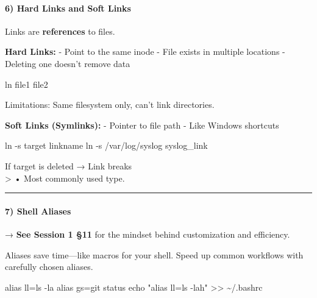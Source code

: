 \documentclass[
  english,
  paper=a4,
  oneside  ,captions=tableheading
]{scrartcl}
\newenvironment{Shaded}{}{}
\newcommand{\AttributeTok}[1]{\textcolor[rgb]{0.49,0.56,0.16}{#1}}
\newcommand{\BuiltInTok}[1]{\textcolor[rgb]{0.00,0.50,0.00}{#1}}
\newcommand{\FunctionTok}[1]{\textcolor[rgb]{0.02,0.16,0.49}{#1}}
\newcommand{\NormalTok}[1]{#1}
\newcommand{\OperatorTok}[1]{\textcolor[rgb]{0.40,0.40,0.40}{#1}}
\newcommand{\StringTok}[1]{\textcolor[rgb]{0.25,0.44,0.63}{#1}}
\renewenvironment{quote}{\begin{customblockquote}\list{}{\rightmargin=0em\leftmargin=0em}%
\item\relax\color{blockquote-text}\ignorespaces}{\unskip\unskip\endlist\end{customblockquote}}
\begin{document}
\paragraph{6) Hard Links and Soft
Links}\label{hard-links-and-soft-links}

Links are \textbf{references} to files.

\textbf{Hard Links:} - Point to the same inode - File exists in multiple
locations - Deleting one doesn't remove data

\begin{Shaded}
\begin{Highlighting}[]
\FunctionTok{ln}\NormalTok{ file1 file2}
\end{Highlighting}
\end{Shaded}

Limitations: Same filesystem only, can't link directories.

\textbf{Soft Links (Symlinks):} - Pointer to file path - Like Windows
shortcuts

\begin{Shaded}
\begin{Highlighting}[]
\FunctionTok{ln} \AttributeTok{{-}s}\NormalTok{ target linkname}
\FunctionTok{ln} \AttributeTok{{-}s}\NormalTok{ /var/log/syslog syslog\_link}
\end{Highlighting}
\end{Shaded}

If target is deleted → \faTimesCircle Link breaks\\
\textgreater{} • Most commonly used type.

\begin{center}\rule{0.5\linewidth}{0.5pt}\end{center}

\paragraph{7) Shell Aliases}\label{shell-aliases}

\begin{quote}
→ \textbf{See Session 1 §11} for the mindset behind customization and
efficiency.
\end{quote}

Aliases save time---like macros for your shell. Speed up common
workflows with carefully chosen aliases.

\begin{Shaded}
\begin{Highlighting}[]
\BuiltInTok{alias}\NormalTok{ ll=}\StringTok{\textquotesingle{}ls {-}la\textquotesingle{}}
\BuiltInTok{alias}\NormalTok{ gs=}\StringTok{\textquotesingle{}git status\textquotesingle{}}
\BuiltInTok{echo} \StringTok{"alias ll=\textquotesingle{}ls {-}lah\textquotesingle{}"} \OperatorTok{\textgreater{}\textgreater{}}\NormalTok{ \textasciitilde{}/.bashrc}
\end{Highlighting}
\end{Shaded}
\end{document}

